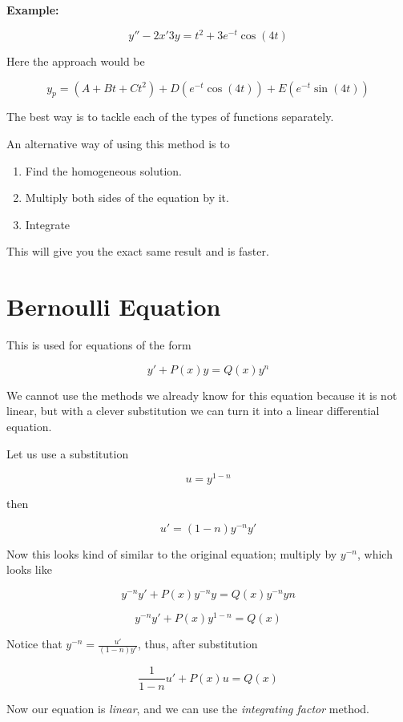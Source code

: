 \textbf{Example:}

\[
    y'' -2x' 3y = t^2  + 3e^{-t} \cos (4t)
\]

Here the approach would be

\[
    y_p = (A + Bt + Ct^2) + D(e^{-t}\cos(4t)) + E(e^{-t}\sin(4t))
\]

The best way is to tackle each of the types of functions separately.

An alternative way of using this method is to

\begin{enumerate}

    \item Find the homogeneous solution.

    \item Multiply both sides of the equation by it.

    \item Integrate

\end{enumerate}

This will give you the exact same result and is faster.

\section{Bernoulli Equation}

This is used for equations of the form

\[
    y' + P(x)y = Q(x)y^n
\]

We cannot use the methods we already know for this equation because it is not linear, but with a
clever substitution we can turn it into a linear differential equation.

Let us use a substitution

\[
    u = y^{1 - n}
\]

then

\[
    u' = (1 - n)y^{-n} y'
\]

Now this
looks kind of similar to the original equation; multiply by \(y^{-n}\), which looks like

\[
    y^{-n}y' + P(x)y^{-n}y = Q(x)y^{-n}y{n}
\]

\[
    y^{-n}y' + P(x)y^{1 - n} = Q(x)
\]

Notice that \(y^{-n} = \frac{u'}{(1-n)y'}\), thus, after substitution

\[
    \frac{1}{1 - n}u' + P(x)u = Q(x)
\]

Now our equation is \emph{linear}, and we can use the \emph{integrating factor} method.

